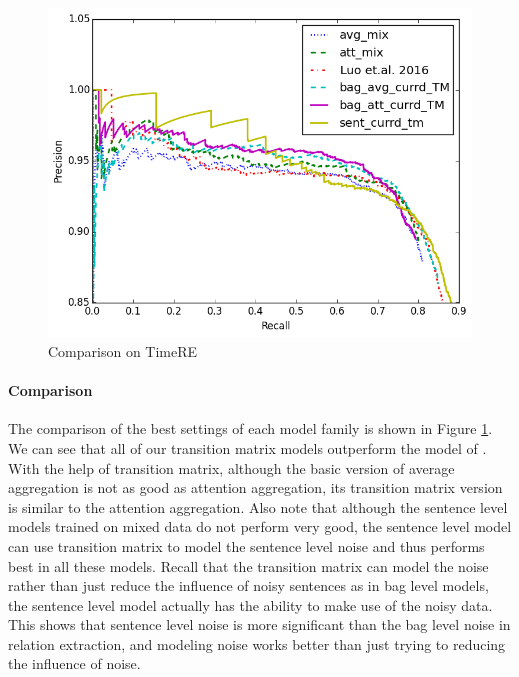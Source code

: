\begin{figure}[htbp]
\begin{center}
\includegraphics[width=0.9\linewidth]{figures/best_cmp_exp_overall.png}
\caption{Comparison on TimeRE}
\label{fig: cmp_luo}
\end{center}
\end{figure}
 
\paragraph{Comparison}
The comparison of the best settings of each model family is shown in Figure \ref{fig: cmp_luo}. We can see that all of our transition matrix models outperform the model of \cite{luo2016temporal}. With the help of transition matrix, although the basic version of average aggregation is not as good as attention aggregation, its transition matrix version is similar to the attention aggregation. Also note that although the sentence level models trained on mixed data do not perform very good, the sentence level model can use transition matrix to model the sentence level noise and thus performs best in all these models. Recall that the transition matrix can model the noise rather than just reduce the influence of noisy sentences as in bag level models, the sentence level model actually has the ability to make use of the noisy data. This shows that sentence level noise is more significant than the bag level noise in relation extraction, and modeling noise works better than just trying to reducing the influence of noise.


